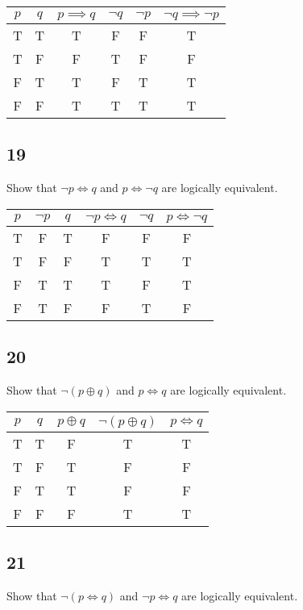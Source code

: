\documentclass{article}
\begin{document}
\begin{tabular}{ | c | c | c | c | c | c | }
	$ p $ & $ q $ & $ p \implies q $ & $ \neg q $ & $ \neg p $ & $ \neg q \implies \neg p $ \\
	\hline
	T & T & T & F & F & T \\
	T & F & F & T & F & F \\
	F & T & T & F & T & T \\
	F & F & T & T & T & T \\
\end{tabular}

\subsection{19}

Show that $ \neg p \iff q $ and $ p \iff \neg q $ are logically equivalent.

\begin{tabular}{ | c | c | c | c | c | c | }
	$ p $ & $ \neg p $ & $ q $ & $ \neg p \iff q $ & $ \neg q $ & $ p \iff \neg q $ \\
	\hline
	T & F & T & F & F & F \\
	T & F & F & T & T & T \\
	F & T & T & T & F & T \\
	F & T & F & F & T & F \\
\end{tabular}

\subsection{20}

Show that $ \neg ( p \oplus q ) $ and $ p \iff q $ are logically equivalent.

\begin{tabular}{ | c | c | c | c | c | }
	$ p $ & $ q $ & $ p \oplus q $ & $ \neg ( p \oplus q ) $ & $ p \iff q $ \\
	\hline
	T & T & F & T & T \\
	T & F & T & F & F \\
	F & T & T & F & F \\
	F & F & F & T & T \\
\end{tabular}

\subsection{21}

Show that $ \neg ( p \iff q ) $ and $ \neg p \iff q $ are logically equivalent.
\end{document}
